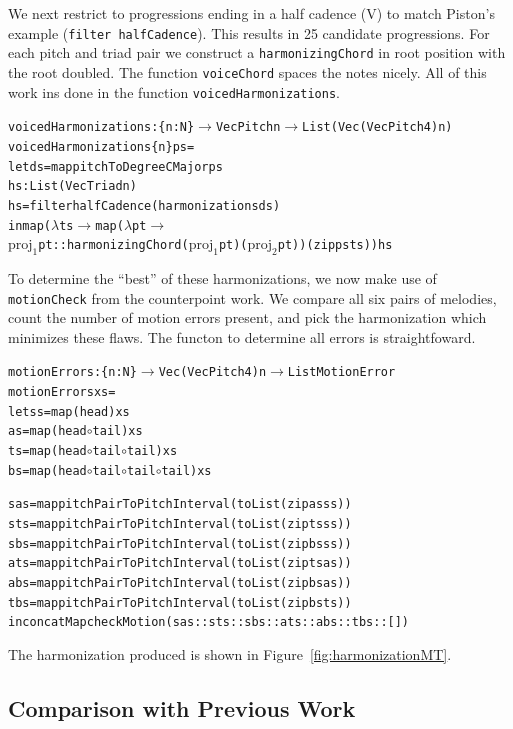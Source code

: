 We next restrict to progressions ending in a half cadence (V) to match
Piston's example (\texttt{filter halfCadence}). This results in 25
candidate progressions. For each pitch and triad pair we construct a
\texttt{harmonizingChord} in root position with the root doubled. The
function \texttt{voiceChord} spaces the notes nicely. All of this work
ins done in the function \texttt{voicedHarmonizations}.

\begin{alltt}
voicedHarmonizations : \{n : N\} \(\rightarrow\) Vec Pitch n \(\rightarrow\) List (Vec (Vec Pitch 4) n)
voicedHarmonizations \{n\} ps =
  let ds = map pitchToDegreeCMajor ps
      hs : List (Vec Triad n)
      hs = filter halfCadence (harmonizations ds)
      in map (\(\lambda\) ts \(\rightarrow\) map (\(\lambda\) pt \(\rightarrow\)
             \(\text{proj}_1\) pt :: harmonizingChord (\(\text{proj}_1\) pt) (\(\text{proj}_2\) pt)) (zip ps ts)) hs
\end{alltt}

To determine the ``best'' of these harmonizations, we now make use of
\texttt{motionCheck} from the counterpoint work. We compare all six
pairs of melodies, count the number of motion errors present, and pick
the harmonization which minimizes these flaws. The functon to
determine all errors is straightfoward.

\begin{alltt}
motionErrors : \{n : N\} \(\rightarrow\) Vec (Vec Pitch 4) n \(\rightarrow\) List MotionError
motionErrors xs =
  let ss = map (head) xs
      as = map (head \(\circ\) tail) xs
      ts = map (head \(\circ\) tail \(\circ\) tail) xs
      bs = map (head \(\circ\) tail \(\circ\) tail \(\circ\) tail) xs

      sas = map pitchPairToPitchInterval (toList (zip as ss))
      sts = map pitchPairToPitchInterval (toList (zip ts ss))
      sbs = map pitchPairToPitchInterval (toList (zip bs ss))
      ats = map pitchPairToPitchInterval (toList (zip ts as))
      abs = map pitchPairToPitchInterval (toList (zip bs as))
      tbs = map pitchPairToPitchInterval (toList (zip bs ts))
  in concatMap checkMotion (sas :: sts :: sbs :: ats :: abs :: tbs :: [])
\end{alltt}

The harmonization produced is shown in Figure~\ref{fig:harmonizationMT}.

\HarmonizationMT

\subsection{Comparison with Previous Work}
\label{sec:harmony:compare}


